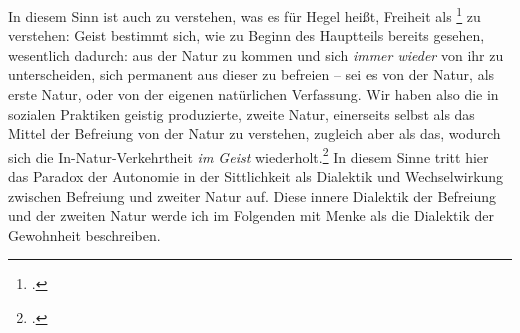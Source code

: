 \documentclass[12pt, a4paper, openany]{report}
\begin{document}
In diesem Sinn ist auch zu verstehen, was es für Hegel heißt, Freiheit als \footcite[][§ 194 A, S. 197.]{hegel_grundlinien_2017} zu verstehen: 
Geist bestimmt sich, wie zu Beginn des Hauptteils bereits gesehen, wesentlich dadurch: 
aus der Natur zu kommen und sich \emph{immer wieder} von ihr zu unterscheiden, sich permanent aus dieser zu befreien -- sei es von der Natur, als erste Natur, oder von der eigenen natürlichen Verfassung.
Wir haben also die in sozialen Praktiken geistig produzierte, zweite Natur, einerseits selbst als das Mittel der Befreiung von der Natur zu verstehen, zugleich aber als das, wodurch sich die In-Natur-Verkehrtheit \emph{im Geist} wiederholt.\footcite[Vgl.][41]{menke_autonomie_2018}
In diesem Sinne tritt hier das Paradox der Autonomie in der Sittlichkeit als Dialektik und Wechselwirkung zwischen Befreiung und zweiter Natur auf.
Diese innere Dialektik der Befreiung und der zweiten Natur werde ich im Folgenden mit Menke als die Dialektik der Gewohnheit beschreiben.
\end{document}
